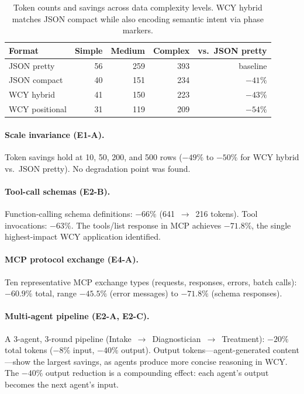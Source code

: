 \documentclass[11pt,a4paper]{article}
\begin{document}
\begin{table}[H]
\centering
\small
\begin{tabular}{@{}lrrrr@{}}
\toprule
\textbf{Format} & \textbf{Simple} & \textbf{Medium} & \textbf{Complex} & \textbf{vs.\ JSON pretty} \\
\midrule
JSON pretty    & 56  & 259 & 393 & baseline \\
JSON compact   & 40  & 151 & 234 & $-41\%$ \\
WCY hybrid     & 41  & 150 & 223 & $-43\%$ \\
WCY positional & 31  & 119 & 209 & $-54\%$ \\
\bottomrule
\end{tabular}
\caption{Token counts and savings across data complexity levels. WCY hybrid matches JSON compact while also encoding semantic intent via phase markers.}
\label{tab:tokens}
\end{table}

\paragraph{Scale invariance (E1-A).}
Token savings hold at 10, 50, 200, and 500 rows ($-49\%$ to $-50\%$ for WCY hybrid vs.\ JSON pretty). No degradation point was found.

\paragraph{Tool-call schemas (E2-B).}
Function-calling schema definitions: $-66\%$ (641~$\to$~216 tokens). Tool invocations: $-63\%$. The tools/list response in MCP achieves $-71.8\%$, the single highest-impact WCY application identified.

\paragraph{MCP protocol exchange (E4-A).}
Ten representative MCP exchange types (requests, responses, errors, batch calls): $-60.9\%$ total, range $-45.5\%$ (error messages) to $-71.8\%$ (schema responses).

\paragraph{Multi-agent pipeline (E2-A, E2-C).}
A 3-agent, 3-round pipeline (Intake~$\to$~Diagnostician~$\to$~Treatment): $-20\%$ total tokens ($-8\%$ input, $-40\%$ output). Output tokens---agent-generated content---show the largest savings, as agents produce more concise reasoning in WCY. The $-40\%$ output reduction is a compounding effect: each agent's output becomes the next agent's input.
\end{document}
